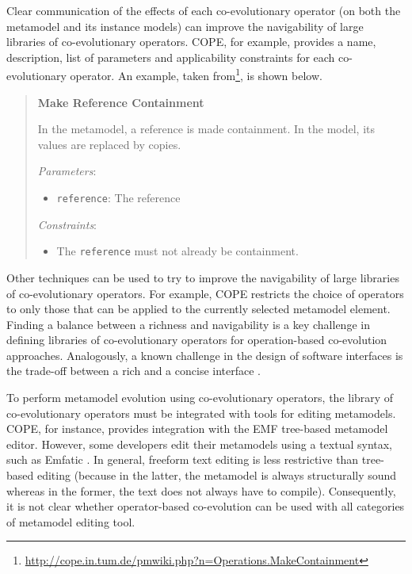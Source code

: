 Clear communication of the effects of each co-evolutionary operator (on both the metamodel and its instance models) can improve the navigability of large libraries of co-evolutionary operators. COPE, for example, provides a name, description, list of parameters and applicability constraints for each co-evolutionary operator. An example, taken from\footnote{\url{http://cope.in.tum.de/pmwiki.php?n=Operations.MakeContainment}}, is shown below.

\begin{quote}
\textbf{Make Reference Containment}

In the metamodel, a reference is made containment. In the model, its values are replaced by copies.

\emph{Parameters}:
\begin{itemize}
	\item \texttt{reference}: The reference
\end{itemize}

\emph{Constraints}:
\begin{itemize}
	\item The \texttt{reference} must not already be containment.
\end{itemize}
\end{quote}

Other techniques can be used to try to improve the navigability of large libraries of co-evolutionary operators. For example, COPE restricts the choice of operators to only those that can be applied to the currently selected metamodel element. Finding a balance between a richness and navigability is a key challenge in defining libraries of co-evolutionary operators for operation-based co-evolution approaches. Analogously, a known challenge in the design of software interfaces is the trade-off between a rich and a concise interface \cite{bloch05apis}.

To perform metamodel evolution using co-evolutionary operators, the library of co-evolutionary operators must be integrated with tools for editing metamodels. COPE, for instance, provides integration with the EMF tree-based metamodel editor. However, some developers edit their metamodels using a textual syntax, such as Emfatic \cite{emfatic}. In general, freeform text editing is less restrictive than tree-based editing (because in the latter, the metamodel is always structurally sound whereas in the former, the text does not always have to compile). Consequently, it is not clear whether operator-based co-evolution can be used with all categories of metamodel editing tool.


